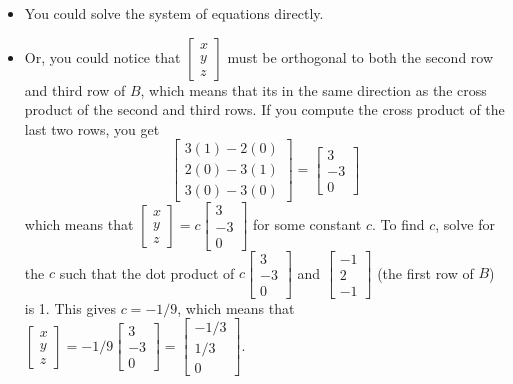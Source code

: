 \documentclass[11pt]{article}
\begin{document}
\begin{prob}
\begin{subprob}
\begin{solution}
\begin{itemize}
    \item You could solve the system of equations directly.
    \item Or, you could notice that $\begin{bmatrix} x \\ y \\ z \end{bmatrix}$ must be orthogonal to both the second row and third row of $B$, which means that its in the same direction as the cross product of the second and third rows. If you compute the cross product of the last two rows, you get $$\begin{bmatrix} 3(1) - 2(0) \\ 2(0) - 3(1) \\ 3(0) - 3(0) \end{bmatrix} = \begin{bmatrix} 3 \\ -3 \\ 0 \end{bmatrix}$$ which means that $\begin{bmatrix} x \\ y \\ z \end{bmatrix} = c \begin{bmatrix} 3 \\ -3 \\ 0 \end{bmatrix}$ for some constant $c$. To find $c$, solve for the $c$ such that the dot product of $c \begin{bmatrix} 3 \\ -3 \\ 0 \end{bmatrix}$ and $\begin{bmatrix} -1 \\ 2 \\ -1 \end{bmatrix}$ (the first row of $B$) is 1. This gives $c = -1/9$, which means that $\begin{bmatrix} x \\ y \\ z \end{bmatrix} = -1/9 \begin{bmatrix} 3 \\ -3 \\ 0 \end{bmatrix} = \begin{bmatrix} -1/3 \\ 1/3 \\ 0 \end{bmatrix}$.
\end{itemize}
\end{solution}
\end{subprob}


\end{prob}
\end{document}
